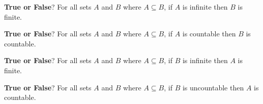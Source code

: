 
{\bf True or False}?  For all sets $A$ and $B$ where  $A \subseteq B$, 
if $A$ is infinite then $B$ is finite.

\vfill

{\bf True or False}?   For all sets $A$ and $B$ where  $A \subseteq B$, 
if $A$ is countable then $B$ is countable.

\vfill

{\bf True or False}?   For all sets $A$ and $B$ where  $A \subseteq B$, 
if $B$ is infinite then $A$ is finite.

\vfill

{\bf True or False}?   For all sets $A$ and $B$ where  $A \subseteq B$, 
if $B$ is uncountable then $A$ is countable.

\vfill